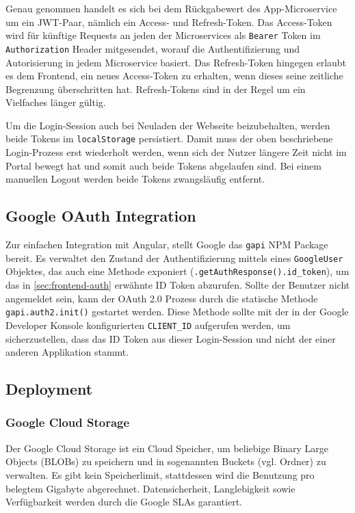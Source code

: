 \documentclass{article}
\begin{document}
Genau genommen handelt es sich bei dem Rückgabewert des App-Microservice um ein JWT-Paar, nämlich ein Access- und Refresh-Token. Das Access-Token wird für künftige Requests an jeden der Microservices als \texttt{Bearer} Token im \texttt{Authorization} Header mitgesendet, worauf die Authentifizierung und Autorisierung in jedem Microservice basiert. Das Refresh-Token hingegen erlaubt es dem Frontend, ein neues Access-Token zu erhalten, wenn dieses seine zeitliche Begrenzung überschritten hat. Refresh-Tokens sind in der Regel um ein Vielfaches länger gültig.

Um die Login-Session auch bei Neuladen der Webseite beizubehalten, werden beide Tokens im \texttt{localStorage} persistiert. Damit muss der oben beschriebene Login-Prozess erst wiederholt werden, wenn sich der Nutzer längere Zeit nicht im Portal bewegt hat und somit auch beide Tokens abgelaufen sind. Bei einem manuellen Logout werden beide Tokens zwangsläufig entfernt. 


\subsection{Google OAuth Integration}

Zur einfachen Integration mit Angular, stellt Google das \texttt{gapi} NPM Package bereit. Es verwaltet den Zustand der Authentifizierung mittels eines \texttt{GoogleUser} Objektes, das auch eine Methode exponiert (\texttt{.getAuthResponse().id\_token}), um das in \autoref{sec:frontend-auth} erwähnte ID Token abzurufen. Sollte der Benutzer nicht angemeldet sein, kann der OAuth 2.0 Prozess durch die statische Methode \texttt{gapi.auth2.init()} gestartet werden. Diese Methode sollte mit der in der Google Developer Konsole konfigurierten \texttt{CLIENT\_ID} aufgerufen werden, um sicherzustellen, dass das ID Token aus dieser Login-Session und nicht der einer anderen Applikation stammt. 


\subsection{Deployment}


\subsubsection{Google Cloud Storage}

Der Google Cloud Storage ist ein Cloud Speicher, um beliebige Binary Large Objects (BLOBs) zu speichern und in sogenannten Buckets (vgl. Ordner) zu verwalten. Es gibt kein Speicherlimit, stattdessen wird die Benutzung pro belegtem Gigabyte abgerechnet. Datensicherheit, Langlebigkeit sowie Verfügbarkeit werden durch die Google SLAs garantiert.
\end{document}
